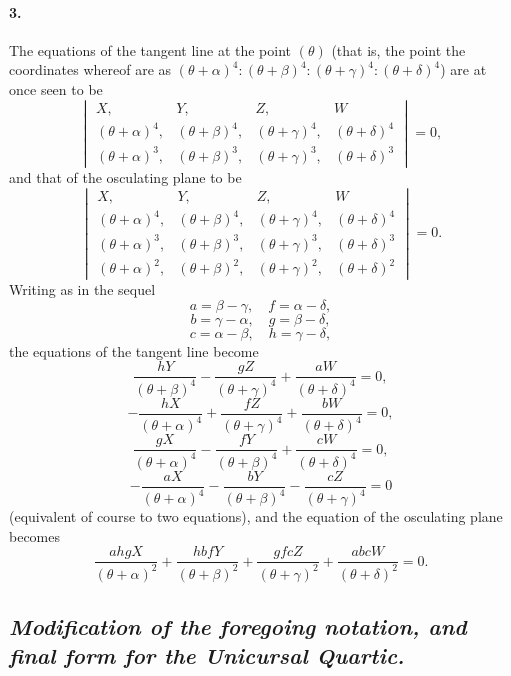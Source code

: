\documentclass[11pt,a4paper]{article}
\begin{document}
\paragraph{3.}
The equations of the tangent line at the point $(\theta)$ (that is, the point the
coordinates whereof are as $(\theta + \alpha)^4 : (\theta + \beta)^4 :
(\theta + \gamma)^4 : (\theta + \delta)^4$) are at once seen to be
\[
\begin{vmatrix}
X, & Y, & Z, & W \\
(\theta + \alpha)^4, & (\theta + \beta)^4, & (\theta + \gamma)^4, & (\theta + \delta)^4 \\
(\theta + \alpha)^3, & (\theta + \beta)^3, & (\theta + \gamma)^3, & (\theta + \delta)^3
\end{vmatrix} = 0,
\]
and that of the osculating plane to be
\[
\begin{vmatrix}
X, & Y, & Z, & W \\
(\theta + \alpha)^4, & (\theta + \beta)^4, & (\theta + \gamma)^4, & (\theta + \delta)^4 \\
(\theta + \alpha)^3, & (\theta + \beta)^3, & (\theta + \gamma)^3, & (\theta + \delta)^3 \\
(\theta + \alpha)^2, & (\theta + \beta)^2, & (\theta + \gamma)^2, & (\theta + \delta)^2
\end{vmatrix} = 0.
\]
Writing as in the sequel
\[
a = \beta - \gamma,\quad f = \alpha - \delta,
\]
\[
b = \gamma - \alpha,\quad g = \beta - \delta,
\]
\[
c = \alpha - \beta,\quad h = \gamma - \delta,
\]
the equations of the tangent line become
\[
\frac{hY}{(\theta + \beta)^4} - \frac{gZ}{(\theta + \gamma)^4} + \frac{aW}{(\theta + \delta)^4} = 0,
\]
\[
-\frac{hX}{(\theta + \alpha)^4} + \frac{fZ}{(\theta + \gamma)^4} + \frac{bW}{(\theta + \delta)^4} = 0,
\]
\[
\frac{gX}{(\theta + \alpha)^4} - \frac{fY}{(\theta + \beta)^4} + \frac{cW}{(\theta + \delta)^4} = 0,
\]
\[
-\frac{aX}{(\theta + \alpha)^4} - \frac{bY}{(\theta + \beta)^4} - \frac{cZ}{(\theta + \gamma)^4} = 0
\]
(equivalent of course to two equations), and the equation of the osculating plane becomes
\[
\frac{ahgX}{(\theta + \alpha)^2} + \frac{hbfY}{(\theta + \beta)^2}
+ \frac{gfcZ}{(\theta + \gamma)^2} + \frac{abcW}{(\theta + \delta)^2} = 0.
\]

\subsection*{\textit{Modification of the foregoing notation, and final form for the Unicursal Quartic.}}
\end{document}
